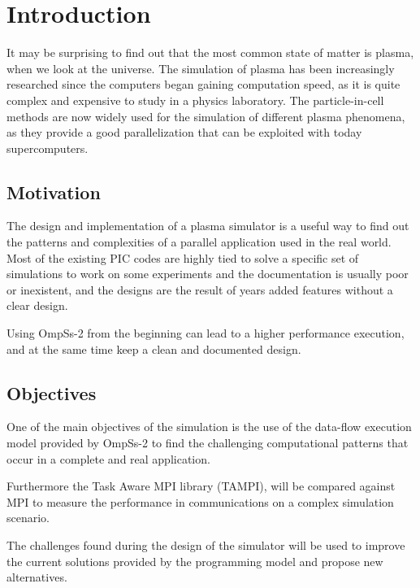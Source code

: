 \chapter{Introduction}
\label{ch:intro}

It may be surprising to find out that the most common state of matter is plasma, 
when we look at the universe. The simulation of plasma has been increasingly 
researched since the computers began gaining computation speed, as it is quite 
complex and expensive to study in a physics laboratory. The particle-in-cell 
methods are now widely used for the simulation of different plasma phenomena, as 
they provide a good parallelization that can be exploited with today 
supercomputers.

\section{Motivation}

The design and implementation of a plasma simulator is a useful way to find out 
the patterns and complexities of a parallel application used in the real world.  
Most of the existing PIC codes are highly tied to solve a specific set of 
simulations to work on some experiments and the documentation is usually poor or 
inexistent, and the designs are the result of years added features without a 
clear design.

Using OmpSs-2 from the beginning can lead to a higher performance execution, and 
at the same time keep a clean and documented design.

\section{Objectives}

One of the main objectives of the simulation is the use of the data-flow 
execution model provided by OmpSs-2 to find the challenging computational 
patterns that occur in a complete and real application.

Furthermore the Task Aware MPI library (TAMPI), will be compared against MPI to 
measure the performance in communications on a complex simulation scenario.

The challenges found during the design of the simulator will be used to improve 
the current solutions provided by the programming model and propose new 
alternatives.


